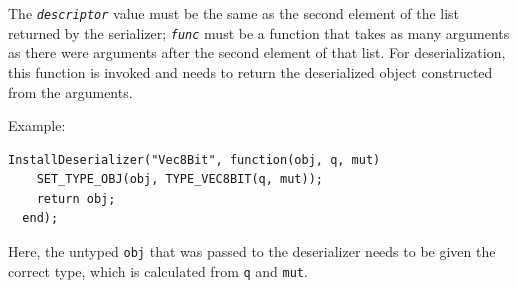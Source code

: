 \documentclass[a4paper,11pt]{report}
\begin{document}
{{{ The \mbox{\texttt{\mdseries\slshape descriptor}} value must be the same as the second element of the list returned by the
serializer; \mbox{\texttt{\mdseries\slshape func}} must be a function that takes as many arguments as there were arguments after
the second element of that list. For deserialization, this function is invoked
and needs to return the deserialized object constructed from the arguments. 

 Example: 
\begin{Verbatim}[commandchars=!@|,fontsize=\small,frame=single,label=Example]
  InstallDeserializer("Vec8Bit", function(obj, q, mut)
    SET_TYPE_OBJ(obj, TYPE_VEC8BIT(q, mut));
    return obj;
  end);
\end{Verbatim}
 Here, the untyped \texttt{obj} that was passed to the deserializer needs to be given the correct type, which
is calculated from \texttt{q} and \texttt{mut}. }

 }

 }

 
\end{document}
